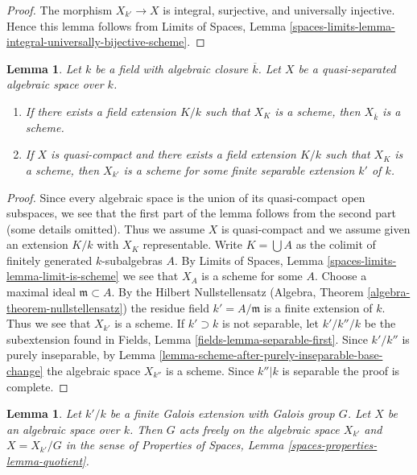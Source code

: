 \documentclass{stacks-project}
\theoremstyle{plain}
\newtheorem{lemma}[subsection]{Lemma}
\theoremstyle{definition}
\theoremstyle{remark}
\numberwithin{equation}{subsection}
\begin{document}
\begin{proof}
The morphism $X_{k'} \to X$ is integral, surjective, and
universally injective. Hence this lemma follows from
Limits of Spaces, Lemma
\ref{spaces-limits-lemma-integral-universally-bijective-scheme}.
\end{proof}

\begin{lemma}
\label{lemma-when-scheme-after-base-change}
Let $k$ be a field with algebraic closure $\overline{k}$.
Let $X$ be a quasi-separated algebraic space over $k$.
\begin{enumerate}
\item If there exists a field extension $K/k$ such that
$X_K$ is a scheme, then $X_{\overline{k}}$ is a scheme.
\item If $X$ is quasi-compact and there exists a field extension
$K/k$ such that $X_K$ is a scheme, then $X_{k'}$
is a scheme for some finite separable extension $k'$ of $k$.
\end{enumerate}
\end{lemma}

\begin{proof}
Since every algebraic space is the union of its quasi-compact open
subspaces, we see that the first part of the lemma follows from
the second part (some details omitted). Thus we assume $X$ is quasi-compact
and we assume given an extension $K/k$ with $X_K$ representable.
Write $K = \bigcup A$ as the colimit of finitely generated $k$-subalgebras
$A$. By Limits of Spaces, Lemma \ref{spaces-limits-lemma-limit-is-scheme}
we see that $X_A$ is a scheme for some $A$. Choose a maximal ideal
$\mathfrak m \subset A$. By the Hilbert Nullstellensatz
(Algebra, Theorem \ref{algebra-theorem-nullstellensatz})
the residue field $k' = A/\mathfrak m$ is a finite extension of $k$.
Thus we see that $X_{k'}$ is a scheme. If $k' \supset k$ is not
separable, let $k'/k''/k$ be the subextension
found in Fields, Lemma \ref{fields-lemma-separable-first}.
Since $k'/k''$ is purely inseparable, by
Lemma \ref{lemma-scheme-after-purely-inseparable-base-change}
the algebraic space $X_{k''}$ is a scheme. Since $k''|k$ is separable
the proof is complete.
\end{proof}

\begin{lemma}
\label{lemma-base-change-by-Galois}
Let $k'/k$ be a finite Galois extension with Galois group $G$.
Let $X$ be an algebraic space over $k$. Then $G$ acts freely on the
algebraic space $X_{k'}$ and $X = X_{k'}/G$ in the sense of
Properties of Spaces, Lemma \ref{spaces-properties-lemma-quotient}.
\end{lemma}
\end{document}
